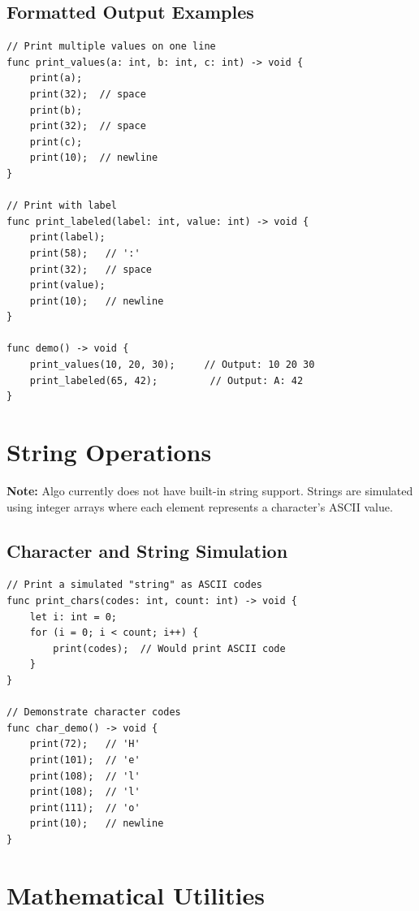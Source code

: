 \documentclass[12pt,a4paper,oneside]{book}
\begin{document}
\subsection{Formatted Output Examples}

\begin{lstlisting}[style=algo, caption={Custom Output Functions}]
// Print multiple values on one line
func print_values(a: int, b: int, c: int) -> void {
    print(a);
    print(32);  // space
    print(b);
    print(32);  // space
    print(c);
    print(10);  // newline
}

// Print with label
func print_labeled(label: int, value: int) -> void {
    print(label);
    print(58);   // ':'
    print(32);   // space
    print(value);
    print(10);   // newline
}

func demo() -> void {
    print_values(10, 20, 30);     // Output: 10 20 30
    print_labeled(65, 42);         // Output: A: 42
}
\end{lstlisting}

\section{String Operations}

\textbf{Note:} Algo currently does not have built-in string support. Strings are simulated using integer arrays where each element represents a character's ASCII value.

\subsection{Character and String Simulation}

\begin{lstlisting}[style=algo, caption={Simulating String Operations}]
// Print a simulated "string" as ASCII codes
func print_chars(codes: int, count: int) -> void {
    let i: int = 0;
    for (i = 0; i < count; i++) {
        print(codes);  // Would print ASCII code
    }
}

// Demonstrate character codes
func char_demo() -> void {
    print(72);   // 'H'
    print(101);  // 'e'
    print(108);  // 'l'
    print(108);  // 'l'
    print(111);  // 'o'
    print(10);   // newline
}
\end{lstlisting}

\section{Mathematical Utilities}
\end{document}
